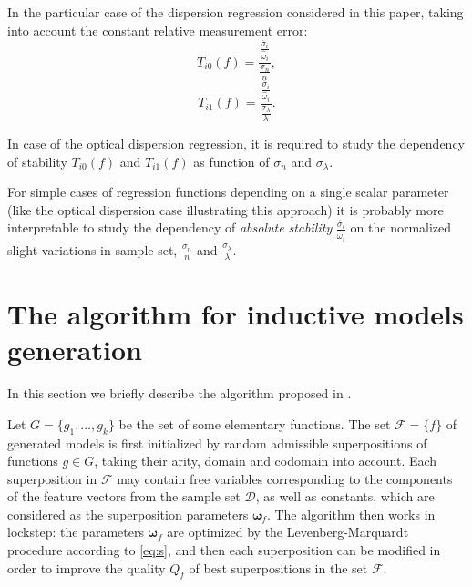 \documentclass[11pt,a4paper]{article}
\theoremstyle{definition}
\begin{document}
In the particular case of the dispersion regression considered in this paper, taking into account
the constant relative measurement error:
\[
  T_{i0}(f) = \frac{\frac{\overline{\sigma}_i}{\hat{\omega}_i}}{\frac{\sigma_n}{n}},
\]
\[
  T_{i1}(f) = \frac{\frac{\overline{\sigma}_i}{\hat{\omega}_i}}{\frac{\sigma_{\lambda}}{\lambda}}.
\]

In case of the optical dispersion regression, it is required to study the dependency of stability
$T_{i0}(f)$ and $T_{i1}(f)$ as function of $\sigma_n$ and $\sigma_{\lambda}$.

For simple cases of regression functions depending on a single scalar parameter (like the optical
dispersion case illustrating this approach) it is probably more interpretable to study the
dependency of \emph{absolute stability} $\frac{\overline{\sigma}_i}{\hat{\omega}_i}$ on the
normalized slight variations in sample set, $\frac{\sigma_n}{n}$ and $\frac{\sigma_{\lambda}}{\lambda}$.

\section{The algorithm for inductive models generation}

In this section we briefly describe the algorithm proposed in \cite{Rudoy13}.

Let $G = \{ g_1, \dots, g_k \}$ be the set of some elementary functions.
The set $\mathcal{F} = \{ f \}$ of generated models is first initialized
by random admissible superpositions of functions $g \in G$, taking their
arity, domain and codomain into account. Each superposition in $\mathcal{F}$
may contain free variables corresponding to the components of the feature
vectors from the sample set $\mathcal{D}$, as well as constants, which are
considered as the superposition parameters $\boldsymbol{\omega}_f$.
The algorithm then works in lockstep: the parameters $\boldsymbol{\omega}_f$
are optimized by the Levenberg-Marquardt procedure according to
\eqref{eq:s}, and then each superposition can be modified
in order to improve the quality $Q_f$ of best superpositions
in the set $\mathcal{F}$.
\end{document}
